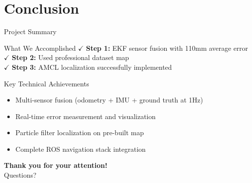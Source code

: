 \documentclass[10pt]{beamer}
\begin{document}
\section{Conclusion}

\begin{frame}{Project Summary}
\begin{block}{What We Accomplished}
$\checkmark$ \textbf{Step 1:} EKF sensor fusion with 110mm average error\\
$\checkmark$ \textbf{Step 2:} Used professional dataset map\\
$\checkmark$ \textbf{Step 3:} AMCL localization successfully implemented
\end{block}

\begin{block}{Key Technical Achievements}
\begin{itemize}
    \item Multi-sensor fusion (odometry + IMU + ground truth at 1Hz)
    \item Real-time error measurement and visualization
    \item Particle filter localization on pre-built map
    \item Complete ROS navigation stack integration
\end{itemize}
\end{block}

\begin{center}
\Large \textbf{Thank you for your attention!} \\
\vspace{0.5cm}
\normalsize Questions?
\end{center}
\end{frame}
\end{document}
